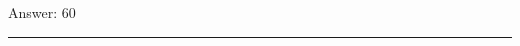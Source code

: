 \documentclass[11pt,paper=a4,answers]{exam}
\begin{document}
\begin{questions}
\begin{solution}
\vspace{30pt}

Answer: \colorbox{yellow!100}{60}
\end{solution}



\end{questions}
\begin{center}
\rule{.5\textwidth}{1pt}
\end{center}
\end{document}

